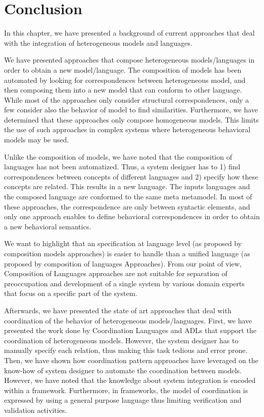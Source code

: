 \section{Conclusion}
In this chapter, we have presented a background of current approaches that deal with the integration of heterogeneous models and languages. 

We have presented approaches that compose heterogeneous models/languages in order to obtain a new model/language. The composition of models has been automated by looking for correspondences between heterogeneous model, and then composing them into a new model that can conform to other language. 
While most of the approaches only consider structural correspondences, only a few consider also the behavior of model to find similarities. Furthermore, we have determined that these approaches only compose homogeneous models. This limits the use of such approaches in complex systems where heterogeneous behavioral models may be used.

Unlike the composition of models, we have noted that the composition of languages has not been automatized. Thus, a system designer has to 1) find correspondences between concepts of different languages and 2) specify how these concepts are related. This results in a new language. The inputs languages and the composed language are conformed to the same meta metamodel. In most of these approaches, the correspondence are only between syntactic elements, and only one approach enables to define behavioral correspondences in order to obtain a new behavioral semantics.  

We want to highlight that an specification at language level (as proposed by composition models approaches) is easier to handle than a unified language (as proposed by composition of languages Approaches). From our point of view, Composition of Languages approaches are not suitable for separation of preoccupation and development of a single system by various domain experts that focus on a specific part of the system.

Afterwards, we have presented the state of art approaches that deal with coordination of the behavior of heterogeneous models/languages. First, we have presented the work done by Coordination Languages and ADLs that support the coordination of heterogeneous models. However, the system designer has to manually specify each relation, thus making this task tedious and error prone. Then, we have shown how coordination pattern approaches have leveraged on the know-how of system designer to automate the coordination between models. However, we have noted that the knowledge about system integration is encoded within a framework. Furthermore, in frameworks, the model of coordination is expressed by using a general purpose language thus limiting verification and validation activities. 

